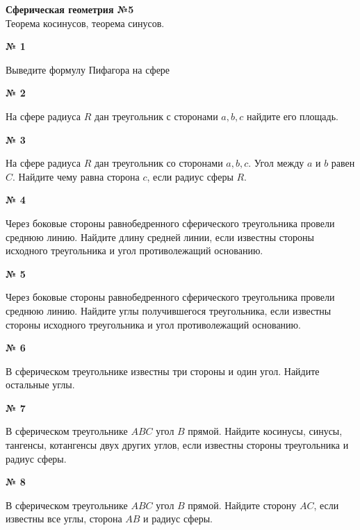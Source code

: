 


    \begin{center}
        \textbf{Сферическая геометрия №5}\\
        Теорема косинусов, теорема синусов.
    \end{center}
    \begin{center}
        \textbf{№ 1}
    \end{center}

    Выведите формулу Пифагора на сфере

    \begin{center}
        \textbf{№ 2}
    \end{center}

    На сфере радиуса $R$ дан треугольник с сторонами $a, b, c$ найдите его площадь.

    \begin{center}
        \textbf{№ 3}
    \end{center}

    На сфере радиуса $R$ дан треугольник со сторонами $a, b, c$.
    Угол между $a$ и $b$ равен $C$.
    Найдите чему равна сторона $c$, если радиус сферы $R$.

    \begin{center}
        \textbf{№ 4}
    \end{center}

    Через боковые стороны равнобедренного сферического треугольника провели среднюю линию.
    Найдите длину средней линии, если известны стороны исходного треугольника и угол противолежащий основанию.


    \begin{center}
        \textbf{№ 5}
    \end{center}

    Через боковые стороны равнобедренного сферического треугольника провели среднюю линию.
    Найдите углы получившегося треугольника, если известны стороны исходного треугольника и угол противолежащий основанию.

    \begin{center}
        \textbf{№ 6}
    \end{center}

    В сферическом треугольнике известны три стороны и один угол.
    Найдите остальные углы.

    \begin{center}
        \textbf{№ 7}
    \end{center}

    В сферическом треугольнике $ABC$ угол $B$ прямой.
    Найдите косинусы, синусы, тангенсы, котангенсы двух других углов,
    если известны стороны треугольника и радиус сферы.

    \begin{center}
        \textbf{№ 8}
    \end{center}

    В сферическом треугольнике $ABC$ угол $B$ прямой.
    Найдите сторону $AC$, если известны все углы, сторона $AB$ и радиус сферы.



